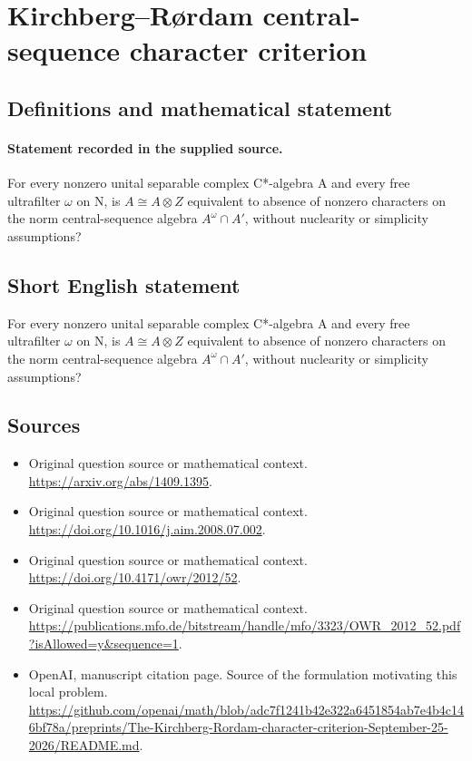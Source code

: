 \documentclass[11pt]{article}
\begin{document}
\section*{Kirchberg–Rørdam central-sequence character criterion}\label{30007313}
\subsection{Definitions and mathematical statement}
\paragraph{Statement recorded in the supplied source.}
For every nonzero unital separable complex C*-algebra A and every free ultrafilter $\omega $ on N, is $A\cong A\otimes Z$ equivalent to absence of nonzero characters on the norm central-sequence algebra $A^\omega \cap A\prime $, without nuclearity or simplicity assumptions?
\subsection{Short English statement}
For every nonzero unital separable complex C*-algebra A and every free ultrafilter $\omega $ on N, is $A\cong A\otimes Z$ equivalent to absence of nonzero characters on the norm central-sequence algebra $A^\omega \cap A\prime $, without nuclearity or simplicity assumptions?
\subsection{Sources}
\begin{itemize}
\item[S1] Original question source or mathematical context.
\url{https://arxiv.org/abs/1409.1395}.
\item[S2] Original question source or mathematical context.
\url{https://doi.org/10.1016/j.aim.2008.07.002}.
\item[S3] Original question source or mathematical context.
\url{https://doi.org/10.4171/owr/2012/52}.
\item[S4] Original question source or mathematical context.
\url{https://publications.mfo.de/bitstream/handle/mfo/3323/OWR_2012_52.pdf?isAllowed=y&sequence=1}.
\item[S5] OpenAI, manuscript citation page. Source of the formulation motivating this local problem.
\url{https://github.com/openai/math/blob/adc7f1241b42e322a6451854ab7e4b4c146bf78a/preprints/The-Kirchberg-Rordam-character-criterion-September-25-2026/README.md}.
\end{itemize}
\end{document}
